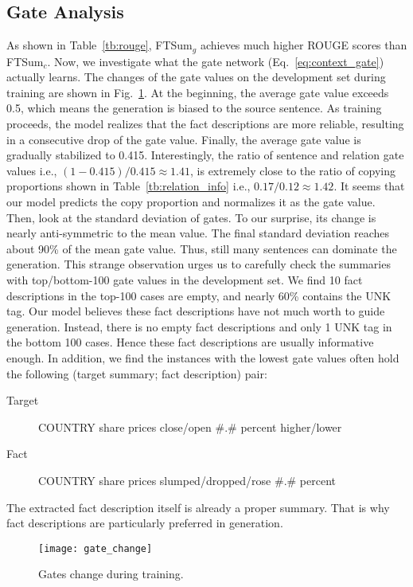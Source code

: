 \documentclass[letterpaper]{article} \usepackage{aaai18}  \usepackage{times}  \usepackage{helvet}  \usepackage{courier}  \usepackage{url}  \usepackage{graphicx}  \usepackage{amsfonts}
\begin{document}
	
	\subsection{Gate Analysis}
	As shown in Table~\ref{tb:rouge}, FTSum$_g$ achieves much higher ROUGE scores than FTSum$_c$.
	Now, we investigate what the gate network (Eq.~\ref{eq:context_gate}) actually learns.
	The changes of the gate values on the development set during training are shown in Fig.~\ref{fig:gate_change}.
	At the beginning, the average gate value exceeds 0.5, which means the generation is biased to the source sentence.
	As training proceeds, the model realizes that the fact descriptions are more reliable, resulting in a consecutive drop of the gate value.
	Finally, the average gate value is gradually stabilized to 0.415.
	Interestingly, the ratio of sentence and relation gate values i.e.,
	$(1 - 0.415)/0.415 \approx 1.41$, is extremely close to the ratio of copying proportions shown in Table~\ref{tb:relation_info} i.e.,
	$0.17/0.12 \approx 1.42$.
	It seems that our model predicts the copy proportion and normalizes it as the gate value.
	Then, look at the standard deviation of gates.
	To our surprise, its change is nearly anti-symmetric to the mean value.
	The final standard deviation reaches about 90\% of the mean gate value.
	Thus, still many sentences can dominate the generation.
This strange observation urges us to carefully check the summaries with top/bottom-100 gate values in the development set.
	We find 10 fact descriptions in the top-100 cases are empty, and nearly 60\% contains the UNK tag.
	Our model believes these fact descriptions have not much worth to guide generation.
	Instead, there is no empty fact descriptions and only 1 UNK tag in the bottom 100 cases.
	Hence these fact descriptions are usually informative enough.
	In addition, we find the instances with the lowest gate values often hold the following (target summary; fact description) pair: 
	\begin{description}
		\item[Target] COUNTRY share prices close/open \#.\# percent higher/lower
		\item[Fact] COUNTRY share prices slumped/dropped/rose \#.\# percent
	\end{description}
	The extracted fact description itself is already a proper summary.
	That is why fact descriptions are particularly preferred in generation.
	
	\begin{figure}
		\centering
		\texttt{[image: gate\_change]}
		\caption{Gates change during training.}
		\label{fig:gate_change}
	\end{figure}
	
\end{document}
